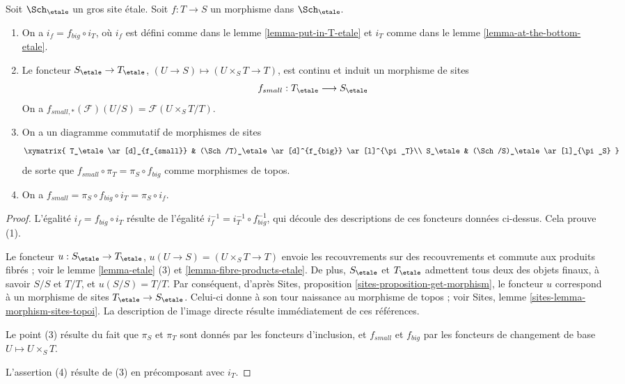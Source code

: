 \begin{lemma}
\label{lemma-morphism-big-small-etale}
Soit $\Sch_\etale$ un gros site étale.
Soit $f : T \to S$ un morphisme dans $\Sch_\etale$.
\begin{enumerate}
\item On a $i_f = f_{big} \circ i_T$, où $i_f$ est défini comme dans le
lemme \ref{lemma-put-in-T-etale} et $i_T$ comme dans le
lemme \ref{lemma-at-the-bottom-etale}.
\item Le foncteur $S_\etale \to T_\etale$,
$(U \to S) \mapsto (U \times_S T \to T)$, est continu et induit
un morphisme de sites
$$
f_{small} : T_\etale \longrightarrow S_\etale
$$
On a $f_{small, *}(\mathcal{F})(U/S) = \mathcal{F}(U \times_S T/T)$.
\item On a un diagramme commutatif de morphismes de sites
$$
\xymatrix{
T_\etale \ar[d]_{f_{small}} &
(\Sch/T)_\etale \ar[d]^{f_{big}} \ar[l]^{\pi_T}\\
S_\etale &
(\Sch/S)_\etale \ar[l]_{\pi_S}
}
$$
de sorte que $f_{small} \circ \pi_T = \pi_S \circ f_{big}$ comme morphismes de topos.
\item On a $f_{small} = \pi_S \circ f_{big} \circ i_T = \pi_S \circ i_f$.
\end{enumerate}
\end{lemma}

\begin{proof}
L'égalité $i_f = f_{big} \circ i_T$ résulte de
l'égalité $i_f^{-1} = i_T^{-1} \circ f_{big}^{-1}$, qui découle
des descriptions de ces foncteurs données ci-dessus.
Cela prouve (1).

\medskip\noindent
Le foncteur
$u :
S_\etale
\to
T_\etale$, $u(U \to S) = (U \times_S T \to T)$
envoie les recouvrements sur des recouvrements et commute aux produits fibrés ;
voir le lemme \ref{lemma-etale} (3) et \ref{lemma-fibre-products-etale}.
De plus, $S_\etale$ et $T_\etale$ admettent tous deux des objets finaux,
à savoir $S/S$ et $T/T$, et $u(S/S) = T/T$. Par conséquent, d'après
Sites, proposition \ref{sites-proposition-get-morphism},
le foncteur $u$ correspond à un morphisme de sites
$T_\etale \to S_\etale$. Celui-ci donne à son tour naissance au
morphisme de topos ; voir
Sites, lemme \ref{sites-lemma-morphism-sites-topoi}. La description
de l'image directe résulte immédiatement de ces références.

\medskip\noindent
Le point (3) résulte du fait que $\pi_S$ et $\pi_T$ sont donnés par les
foncteurs d'inclusion, et $f_{small}$ et $f_{big}$ par les
foncteurs de changement de base $U \mapsto U \times_S T$.

\medskip\noindent
L'assertion (4) résulte de (3) en précomposant avec $i_T$.
\end{proof}

